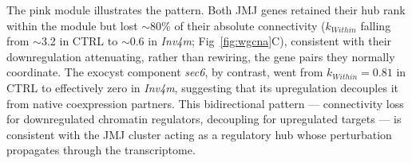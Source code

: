 \documentclass[9pt,twocolumn,twoside]{rilabRxiv}
\newcommand{\invfour}{\textit{Inv4m}\xspace}
\newcommand{\jmjii}{\textit{jmj2}\xspace}
\newcommand{\jmjiv}{\textit{jmj4}\xspace}
\begin{document}
The pink module illustrates the pattern. 
Both JMJ genes retained their hub rank within the module but lost $\sim$80\% of their absolute connectivity ($k_{Within}$ falling from $\sim$3.2 in CTRL to $\sim$0.6 in \invfour; Fig~\ref{fig:wgcna}C), consistent with their downregulation attenuating, rather than rewiring, the gene pairs they normally coordinate. 
The exocyst component \textit{sec6}, by contrast, went from $k_{Within} = 0.81$ in CTRL to effectively zero in \invfour, suggesting that its upregulation decouples it from native coexpression partners. 
This bidirectional pattern --- connectivity loss for downregulated chromatin regulators, decoupling for upregulated targets --- is consistent with the JMJ cluster acting as a regulatory hub whose perturbation propagates through the transcriptome.

\end{document}
